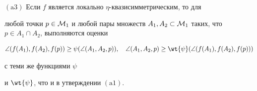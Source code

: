 \begin{thms}
$(\mathrm a3)$ Если $f$ является локально $\eta$-{}квазисимметрическим, то для 


любой точки $p\in {\cal M}_1$ и любой пары множеств $A_1, A_2 \subset 


{\cal M}_1$ таких, что $p\in A_1\cap A_2$, выполняются оценки 


$$


\angle(f(A_1), f(A_2), f(p)) \geq \psi(\angle(A_1, A_2, p)),\quad 


\angle(A_1, A_2, p) \geq \wt{\psi}(\angle(f(A_1), f(A_2), f(p)))


$$


с теми же функциями $\psi$ 


и $\wt{\psi}$, что и в утверждении $(\mathrm a1)$.


\end{thms}








